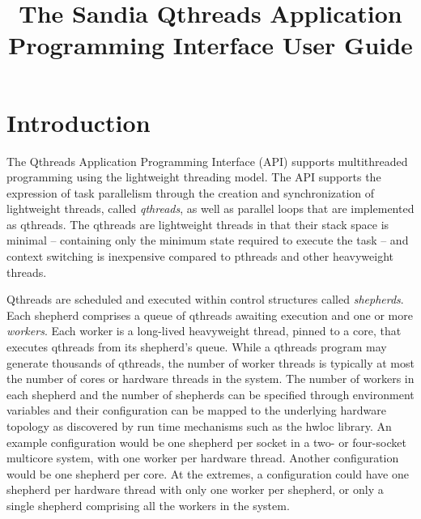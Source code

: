 \documentclass[12pt,fullpage]{article}
\title{The Sandia Qthreads Application Programming Interface User Guide}
\begin{document}
\lstset{language=C,basicstyle=\ttfamily\footnotesize,frame=single}
\maketitle

\section{Introduction}
The Qthreads Application Programming Interface (API) supports multithreaded programming using the lightweight threading model.  The API supports the expression of task parallelism through the creation and synchronization of lightweight threads, called {\it qthreads}, as well as parallel loops that are implemented as qthreads.  The qthreads are lightweight threads in that their stack space is minimal -- containing only the minimum state required to execute the task -- and context switching is inexpensive compared to pthreads and other heavyweight threads.

Qthreads are scheduled and executed within control structures called {\it shepherds}.  Each shepherd comprises a queue of qthreads awaiting execution and one or more {\it workers}.  Each worker is a long-lived heavyweight thread, pinned to a core, that executes qthreads from its shepherd's queue.  While a qthreads program may generate thousands of qthreads, the number of worker threads is typically at most the number of cores or hardware threads in the system.  The number of workers in each shepherd and the number of shepherds can be specified through environment variables and their configuration can be mapped to the underlying hardware topology as discovered by run time mechanisms such as the hwloc library.  An example configuration would be one shepherd per socket in a two- or four-socket multicore system, with one worker per hardware thread.  Another configuration would be one shepherd per core.  At the extremes, a configuration could have one shepherd per hardware thread with only one worker per shepherd, or only a single shepherd comprising all the workers in the system.

\newpage
\end{document}
